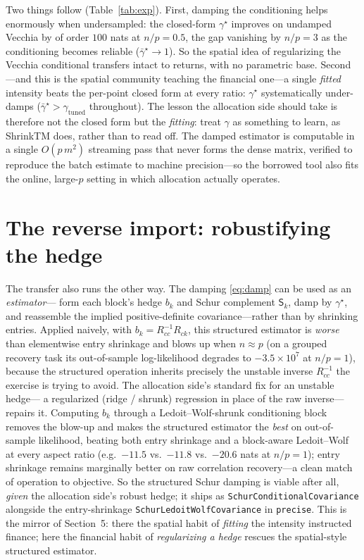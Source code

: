 \documentclass[11pt]{article}
\newcommand{\gstar}{\gamma^\star}
\newcommand{\Sc}{\mathsf S}
\begin{document}
Two things follow (Table~\ref{tab:exp}). First, damping the conditioning helps enormously when
undersampled: the closed-form $\gstar$ improves on undamped Vecchia by of order $100$ nats at
$n/p=0.5$, the gap vanishing by $n/p=3$ as the conditioning becomes reliable ($\bar\gstar\to1$). So the
spatial idea of regularizing the Vecchia conditional transfers intact to returns, with no parametric
base. Second---and this is the spatial community teaching the financial one---a single \emph{fitted}
intensity beats the per-point closed form at every ratio: $\gstar$ systematically under-damps
($\bar\gstar>\gamma_{\text{tuned}}$ throughout). The lesson the allocation side should take is therefore
not the closed form but the \emph{fitting}: treat $\gamma$ as something to learn, as ShrinkTM does,
rather than to read off. The damped estimator is computable in a single $O(p\,m^2)$ streaming pass that
never forms the dense matrix, verified to reproduce the batch estimate to machine precision---so the
borrowed tool also fits the online, large-$p$ setting in which allocation actually operates.

\section{The reverse import: robustifying the hedge}
The transfer also runs the other way. The damping \eqref{eq:damp} can be used as an \emph{estimator}---
form each block's hedge $b_k$ and Schur complement $\Sc_k$, damp by $\gstar$, and reassemble the implied
positive-definite covariance---rather than by shrinking entries. Applied naively, with
$b_k=R_{cc}^{-1}R_{ck}$, this structured estimator is \emph{worse} than elementwise entry shrinkage and
blows up when $n\approx p$ (on a grouped recovery task its out-of-sample log-likelihood degrades to
$-3.5\times10^{7}$ at $n/p=1$), because the structured operation inherits precisely the unstable inverse
$R_{cc}^{-1}$ the exercise is trying to avoid. The allocation side's standard fix for an unstable hedge---
a regularized (ridge / shrunk) regression in place of the raw inverse---repairs it. Computing $b_k$
through a Ledoit--Wolf-shrunk conditioning block removes the blow-up and makes the structured estimator
the \emph{best} on out-of-sample likelihood, beating both entry shrinkage and a block-aware Ledoit--Wolf
at every aspect ratio (e.g.\ $-11.5$ vs.\ $-11.8$ vs.\ $-20.6$ nats at $n/p=1$); entry shrinkage remains
marginally better on raw correlation recovery---a clean match of operation to objective. So the
structured Schur damping is viable after all, \emph{given} the allocation side's robust hedge; it ships
as \texttt{SchurConditionalCovariance} alongside the entry-shrinkage \texttt{SchurLedoitWolfCovariance}
in \texttt{precise}. This is the mirror of Section~5: there the spatial habit of \emph{fitting} the
intensity instructed finance; here the financial habit of \emph{regularizing a hedge} rescues the
spatial-style structured estimator.
\end{document}
